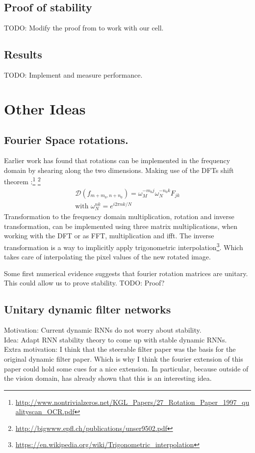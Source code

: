 \documentclass{article}
\begin{document}
\subsection{Proof of stability}
TODO: Modify the proof from \cite{Arjovsky} to work with our cell.

\subsection{Results}
TODO: Implement and measure performance.

\section{Other Ideas}
\subsection{Fourier Space rotations.}
Earlier work has found that rotations can be implemented in the frequency domain by shearing along 
the two dimensions. Making use of the DFTs shift theorem \cite[page 173]{Briggs}:\footnote{\url{http://www.nontrivialzeros.net/KGL_Papers/27_Rotation_Paper_1997_qualityscan_OCR.pdf}}
\footnote{\url{http://bigwww.epfl.ch/publications/unser9502.pdf}}
\begin{align}
\mathcal{D}(f_{m + m_0, n + n_0}) = \omega_M^{-m_0j}\omega_N^{-n_0k}F_{jk} \\
\text{with } \omega_N^{nk} = e^{i2\pi nk/N}
\end{align}
Transformation to the frequency domain multiplication, rotation and inverse transformation, can be implemented using three matrix multiplications, when working with the DFT or as FFT, multiplication and ifft. The inverse transformation is a way to implicitly apply trigonometric interpolation\footnote{\url{https://en.wikipedia.org/wiki/Trigonometric_interpolation}}. Which takes care of interpolating the pixel values of the new rotated image.

Some first numerical evidence suggests that fourier rotation matrices are unitary. This could allow us to prove stability. TODO: Proof?

\subsection{Unitary dynamic filter networks}
Motivation: Current dynamic RNNs do not worry about stability. \\
Idea: Adapt RNN stability theory to come up with stable dynamic RNNs. \\
Extra motivation: I think that the steerable filter paper \cite{Freeman} was the basis for the original dynamic filter paper. Which is why I think the fourier extension of this paper \cite{Michaelis} could hold some cues for a nice extension. In particular, because outside of the vision domain, \cite{Hyland} has already shown that this is an interesting idea. 
\end{document}

